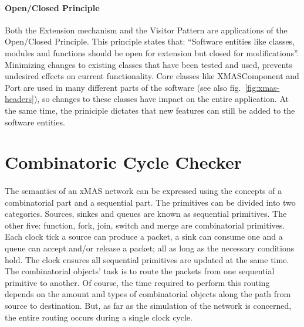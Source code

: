 \documentclass[a4paper,11pt]{article}
\begin{document}
\paragraph{Open/Closed Principle}
Both the Extension mechanism and the Visitor Pattern are applications of the Open/Closed
Principle. This principle states that: ``Software entities like classes, modules and functions
should be open for extension but closed for modifications''\cite{oodesign-open-close}. Minimizing
changes to existing classes that have been tested and used, prevents undesired effects
on current functionality. Core classes like XMASComponent and Port are used in many different parts
of the software (see also fig.~\ref{fig:xmas-headers}), so changes to these classes have impact on the entire application.
At the same time, the priniciple dictates that new features can still be added to the software entities.


\section{Combinatoric Cycle Checker}

\paragraph{}
The semantics of an xMAS network can be expressed using the concepts of a combinatorial part and
a sequential part\cite{analyse-tool-11}. The primitives can be divided into two categories.
Sources, sinkes and queues are known as sequential primitives. The other five: function,
fork, join, switch and merge are combinatorial primitives.\\
Each clock tick a source can produce a packet, a sink can consume one and a queue can accept
and/or release a packet; all as long as the necessary conditions hold. The clock ensures
all sequential primitives are updated at the same time.\\
The combinatorial objects' task is to route the packets from one sequential primitive to another.
Of course, the time required to perform this routing depends on the amount and types of
combinatorial objects along the path from source to destination. But, as far as the simulation of
the network is concerned, the entire routing occurs during a single clock cycle.\\
\end{document}
